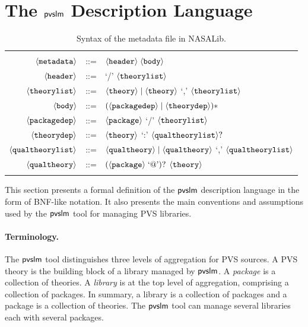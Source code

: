 \section{The $\textsf{pvslm}$ Description Language}
\label{sec.conf}

\begin{table}[pthb]
  \centering
  \begin{tabular}{r c p{8cm}}
    \hline \\
    $\langle{\texttt{metadata}}\rangle$ & ::= & $\langle{\texttt{header}}\rangle \; \langle{\texttt{body}}\rangle$ \\
    $\langle{\texttt{header}}\rangle$ & ::= & `/' $\langle{\texttt{theorylist}}\rangle$ \\
    $\langle{\texttt{theorylist}}\rangle$ & ::= & $\langle{\texttt{theory}}\rangle \mid \langle{\texttt{theory}}\rangle$ `,' $\langle{\texttt{theorylist}}\rangle$ \\
    $\langle{\texttt{body}}\rangle$ & ::= & $(\langle{\texttt{packagedep}}\rangle \mid \langle{\texttt{theorydep}}\rangle)*$ \\
    $\langle{\texttt{packagedep}}\rangle$ & ::= & $\langle{\texttt{package}}\rangle$ `/' $\langle{\texttt{theorylist}}\rangle$ \\
    $\langle{\texttt{theorydep}}\rangle$ & ::= & $\langle{\texttt{theory}}\rangle$ `:' $\langle{\texttt{qualtheorylist}}\rangle ?$ \\
    $\langle{\texttt{qualtheorylist}}\rangle$ & ::= & $\langle{\texttt{qualtheory}}\rangle \mid \langle{\texttt{qualtheory}}\rangle$ `,' $\langle{\texttt{qualtheorylist}}\rangle$ \\
    $\langle{\texttt{qualtheory}}\rangle$ & ::= & $(\langle{\texttt{package}}\rangle\; \text{`@'})?$ $\langle{\texttt{theory}}\rangle$ \\
    \\
    \hline
  \end{tabular}
  \caption{Syntax of the  metadata file in NASALib.}
  \label{tab.bnf}
\end{table}


This section presents a formal definition of the $\textsf{pvslm}$ description
language in the form of BNF-like notation. It also presents the main
conventions and assumptions used by the $\textsf{pvslm}$ tool for managing PVS
libraries.


\paragraph{Terminology.}
The $\textsf{pvslm}$ tool distinguishes three levels of aggregation for PVS
sources. A PVS theory is the building block of a library managed by
$\textsf{pvslm}$. A {\em package} is a collection of theories.  A {\em
  library} is at the top level of aggregation, comprising a collection
of packages. In summary, a library is a collection of packages and a
package is a collection of theories. The $\textsf{pvslm}$ tool can manage
several libraries each with several packages.

